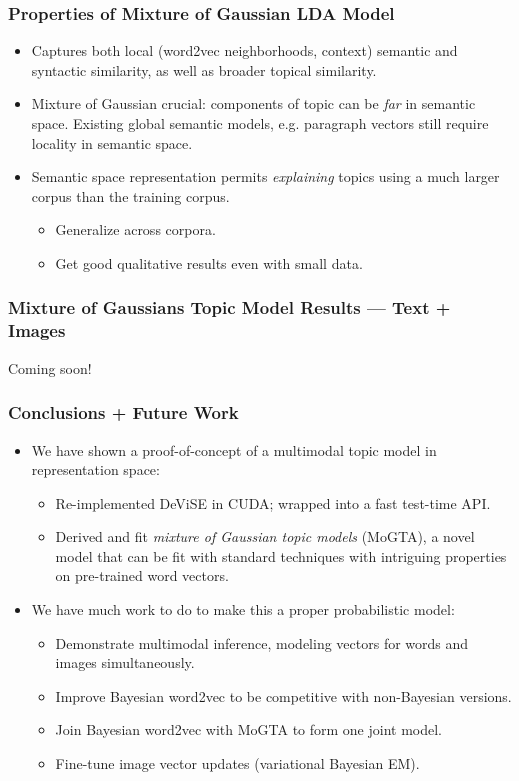 \documentclass{beamer}
\begin{document}
\begin{frame}
  \frametitle{Properties of Mixture of Gaussian LDA Model}
  \begin{itemize}
    \item Captures both local (word2vec neighborhoods, context) semantic and syntactic similarity, as well as broader topical similarity.
    \item Mixture of Gaussian crucial: components of topic can be \emph{far} in semantic space. Existing global semantic models, e.g. paragraph vectors \citep{Le14q} still require locality in semantic space.
    \item Semantic space representation permits \emph{explaining} topics using a much larger corpus than the training corpus.
    \begin{itemize}
      \item Generalize across corpora.
      \item Get good qualitative results even with small data.
    \end{itemize}
        
  \end{itemize}

\end{frame}

\begin{frame}
  \frametitle{Mixture of Gaussians Topic Model Results --- Text + Images}
  Coming soon!
\end{frame}

\begin{frame}
  \frametitle{Conclusions + Future Work}
  \begin{itemize}
    \item We have shown a proof-of-concept of a multimodal topic model in representation space:
    \begin{itemize}
      \item Re-implemented DeViSE in CUDA; wrapped into a fast test-time API.
      \item Derived and fit \emph{mixture of Gaussian topic models} (MoGTA), a novel model that can be fit with standard techniques with intriguing properties on pre-trained word vectors.
    \end{itemize}
    \item We have much work to do to make this a proper probabilistic model:
    \begin{itemize}
      \item Demonstrate multimodal inference, modeling vectors for words and images simultaneously.
      \item Improve Bayesian word2vec to be competitive with non-Bayesian versions.
      \item Join Bayesian word2vec with MoGTA to form one joint model.
      \item Fine-tune image vector updates (variational Bayesian EM).
    \end{itemize}
  \end{itemize}
\end{frame}
\end{document}
